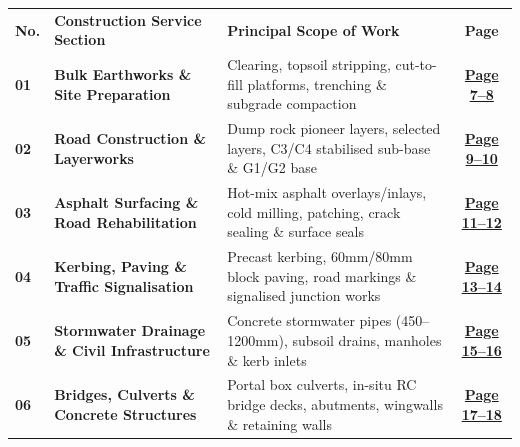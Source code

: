 \documentclass[a4paper,11pt]{article}
\begin{document}
\renewcommand{\arraystretch}{1.20}
\begin{tabularx}{\textwidth}{@{}l p{4.6cm} X c@{}}
\rowcolor{mhnavy}
{\color{white}\bfseries\fontsize{7.8pt}{9.2pt}\selectfont No.} &
{\color{white}\bfseries\fontsize{7.8pt}{9.2pt}\selectfont Construction Service Section} &
{\color{white}\bfseries\fontsize{7.8pt}{9.2pt}\selectfont Principal Scope of Work} &
{\color{white}\bfseries\fontsize{7.8pt}{9.2pt}\selectfont Page} \\
\rowcolor{mhbluelight}
\fontsize{7.5pt}{9.1pt}\selectfont\bfseries 01 & \fontsize{7.5pt}{9.1pt}\selectfont\bfseries Bulk Earthworks \& Site Preparation & \fontsize{7.5pt}{9.1pt}\selectfont Clearing, topsoil stripping, cut-to-fill platforms, trenching \& subgrade compaction & \fontsize{7.5pt}{9.1pt}\selectfont\hyperlink{sec:earthworks}{\bfseries\color{mhblue}Page 7--8} \\
\fontsize{7.5pt}{9.1pt}\selectfont\bfseries 02 & \fontsize{7.5pt}{9.1pt}\selectfont\bfseries Road Construction \& Layerworks & \fontsize{7.5pt}{9.1pt}\selectfont Dump rock pioneer layers, selected layers, C3/C4 stabilised sub-base \& G1/G2 base & \fontsize{7.5pt}{9.1pt}\selectfont\hyperlink{sec:roads}{\bfseries\color{mhblue}Page 9--10} \\
\rowcolor{mhbluelight}
\fontsize{7.5pt}{9.1pt}\selectfont\bfseries 03 & \fontsize{7.5pt}{9.1pt}\selectfont\bfseries Asphalt Surfacing \& Road Rehabilitation & \fontsize{7.5pt}{9.1pt}\selectfont Hot-mix asphalt overlays/inlays, cold milling, patching, crack sealing \& surface seals & \fontsize{7.5pt}{9.1pt}\selectfont\hyperlink{sec:asphalt}{\bfseries\color{mhblue}Page 11--12} \\
\fontsize{7.5pt}{9.1pt}\selectfont\bfseries 04 & \fontsize{7.5pt}{9.1pt}\selectfont\bfseries Kerbing, Paving \& Traffic Signalisation & \fontsize{7.5pt}{9.1pt}\selectfont Precast kerbing, 60mm/80mm block paving, road markings \& signalised junction works & \fontsize{7.5pt}{9.1pt}\selectfont\hyperlink{sec:kerbing}{\bfseries\color{mhblue}Page 13--14} \\
\rowcolor{mhbluelight}
\fontsize{7.5pt}{9.1pt}\selectfont\bfseries 05 & \fontsize{7.5pt}{9.1pt}\selectfont\bfseries Stormwater Drainage \& Civil Infrastructure & \fontsize{7.5pt}{9.1pt}\selectfont Concrete stormwater pipes (450--1200mm), subsoil drains, manholes \& kerb inlets & \fontsize{7.5pt}{9.1pt}\selectfont\hyperlink{sec:stormwater}{\bfseries\color{mhblue}Page 15--16} \\
\fontsize{7.5pt}{9.1pt}\selectfont\bfseries 06 & \fontsize{7.5pt}{9.1pt}\selectfont\bfseries Bridges, Culverts \& Concrete Structures & \fontsize{7.5pt}{9.1pt}\selectfont Portal box culverts, in-situ RC bridge decks, abutments, wingwalls \& retaining walls & \fontsize{7.5pt}{9.1pt}\selectfont\hyperlink{sec:bridges}{\bfseries\color{mhblue}Page 17--18} \\

\end{tabularx}
\end{document}
